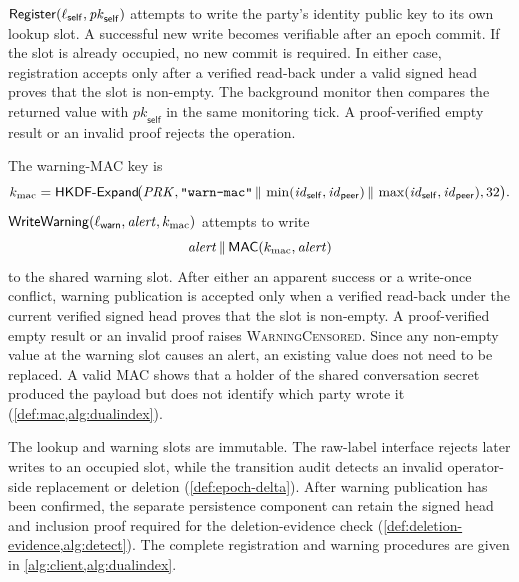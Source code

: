 \begin{definition}\label{def:dualindex-write}
$\mathsf{Register}(\ell_{\mathsf{self}},\mathit{pk}_{\mathsf{self}})$ attempts to write the party's identity
public key to its own lookup slot. A successful new write becomes verifiable after an epoch commit.
If the slot is already occupied, no new commit is required. In either case, registration accepts
only after a verified read-back under a valid signed head proves that the slot is non-empty. The
background monitor then compares the returned value with $\mathit{pk}_{\mathsf{self}}$ in the same
monitoring tick. A proof-verified empty result or an invalid proof rejects the operation.

The warning-MAC key is
\[
k_{\mathrm{mac}}
=
\mathsf{HKDF\text{-}Expand}\!\bigl(
\mathit{PRK},
\text{\texttt{"warn-mac"}}\,\|\,
\min(\mathit{id}_{\mathsf{self}},\mathit{id}_{\mathsf{peer}})\,\|\,
\max(\mathit{id}_{\mathsf{self}},\mathit{id}_{\mathsf{peer}}),
32
\bigr).
\]
$\mathsf{WriteWarning}(\ell_{\mathsf{warn}},\mathit{alert},k_{\mathrm{mac}})$ attempts to write
\[
\mathit{alert}\,\|\,\mathsf{MAC}(k_{\mathrm{mac}},\mathit{alert})
\]
to the shared warning slot. After either an apparent success or a write-once conflict, warning
publication is accepted only when a verified read-back under the current verified signed head
proves that the slot is non-empty. A proof-verified empty result or an invalid proof raises
\textsc{WarningCensored}. Since any non-empty value at the warning slot causes an alert, an existing
value does not need to be replaced. A valid MAC shows that a holder of the shared conversation
secret produced the payload but does not identify which party wrote it
(\cref{def:mac,alg:dualindex}).

The lookup and warning slots are immutable. The raw-label interface rejects later writes to an
occupied slot, while the transition audit detects an invalid operator-side replacement or deletion
(\cref{def:epoch-delta}). After warning publication has been confirmed, the separate persistence
component can retain the signed head and inclusion proof required for the deletion-evidence check
(\cref{def:deletion-evidence,alg:detect}). The complete registration and warning procedures are
given in \cref{alg:client,alg:dualindex}.
\end{definition}

